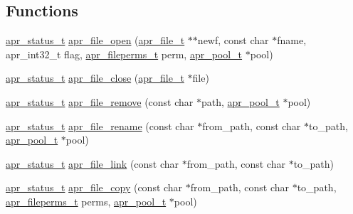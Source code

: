 \subsection*{Functions}
\begin{DoxyCompactItemize}
\item 
\hyperlink{group__apr__errno_gaf76ee4543247e9fb3f3546203e590a6c}{apr\-\_\-status\-\_\-t} \hyperlink{group__apr__file__io_gabda14cbf242fb4fe99055434213e5446}{apr\-\_\-file\-\_\-open} (\hyperlink{group__apr__file__io_gaa46e4763ac375ea3c7a43ba6f6099e22}{apr\-\_\-file\-\_\-t} $\ast$$\ast$newf, const char $\ast$fname, apr\-\_\-int32\-\_\-t flag, \hyperlink{group__apr__file__info_ga3af19c4c47007169064a70f9351bc7d8}{apr\-\_\-fileperms\-\_\-t} perm, \hyperlink{group__apr__pools_gaf137f28edcf9a086cd6bc36c20d7cdfb}{apr\-\_\-pool\-\_\-t} $\ast$pool)
\item 
\hyperlink{group__apr__errno_gaf76ee4543247e9fb3f3546203e590a6c}{apr\-\_\-status\-\_\-t} \hyperlink{group__apr__file__io_ga5607bce1c4c798ceb6c8475a998a81a1}{apr\-\_\-file\-\_\-close} (\hyperlink{group__apr__file__io_gaa46e4763ac375ea3c7a43ba6f6099e22}{apr\-\_\-file\-\_\-t} $\ast$file)
\item 
\hyperlink{group__apr__errno_gaf76ee4543247e9fb3f3546203e590a6c}{apr\-\_\-status\-\_\-t} \hyperlink{group__apr__file__io_ga211c40be82f8bf8b8d7dce5afca5500b}{apr\-\_\-file\-\_\-remove} (const char $\ast$path, \hyperlink{group__apr__pools_gaf137f28edcf9a086cd6bc36c20d7cdfb}{apr\-\_\-pool\-\_\-t} $\ast$pool)
\item 
\hyperlink{group__apr__errno_gaf76ee4543247e9fb3f3546203e590a6c}{apr\-\_\-status\-\_\-t} \hyperlink{group__apr__file__io_ga29b5633bb80226baa5de79a83c6999aa}{apr\-\_\-file\-\_\-rename} (const char $\ast$from\-\_\-path, const char $\ast$to\-\_\-path, \hyperlink{group__apr__pools_gaf137f28edcf9a086cd6bc36c20d7cdfb}{apr\-\_\-pool\-\_\-t} $\ast$pool)
\item 
\hyperlink{group__apr__errno_gaf76ee4543247e9fb3f3546203e590a6c}{apr\-\_\-status\-\_\-t} \hyperlink{group__apr__file__io_gaa7911275c0e97edc064b8167be658f9e}{apr\-\_\-file\-\_\-link} (const char $\ast$from\-\_\-path, const char $\ast$to\-\_\-path)
\item 
\hyperlink{group__apr__errno_gaf76ee4543247e9fb3f3546203e590a6c}{apr\-\_\-status\-\_\-t} \hyperlink{group__apr__file__io_ga2b82c441246cc4596795420b0a94a9a2}{apr\-\_\-file\-\_\-copy} (const char $\ast$from\-\_\-path, const char $\ast$to\-\_\-path, \hyperlink{group__apr__file__info_ga3af19c4c47007169064a70f9351bc7d8}{apr\-\_\-fileperms\-\_\-t} perms, \hyperlink{group__apr__pools_gaf137f28edcf9a086cd6bc36c20d7cdfb}{apr\-\_\-pool\-\_\-t} $\ast$pool)
$$
\end{DoxyCompactItemize}
